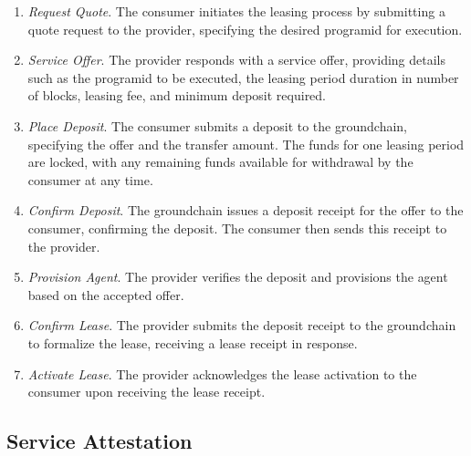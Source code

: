 \documentclass{oc}
\begin{document}
\begin{enumerate}
  \item \emph{Request Quote}. The \gls{consumer} initiates the leasing process by submitting a quote request to the \gls{provider}, specifying the desired \gls{programid} for execution.
  
  \item \emph{Service Offer}. The \gls{provider} responds with a service offer, providing details such as the \gls{programid} to be executed, the leasing period duration in number of blocks, leasing fee, and minimum deposit required.
  
  \item \emph{Place Deposit}. The \gls{consumer} submits a deposit to the \gls{groundchain}, specifying the offer and the transfer amount. The funds for one leasing period are locked, with any remaining funds available for withdrawal by the consumer at any time.
  
  \item \emph{Confirm Deposit}. The \gls{groundchain} issues a deposit receipt for the offer to the \gls{consumer}, confirming the deposit. The \gls{consumer} then sends this receipt to the \gls{provider}.
  
  \item \emph{Provision Agent}. The \gls{provider} verifies the deposit and provisions the \gls{agent} based on the accepted offer.
  
  \item \emph{Confirm Lease}. The \gls{provider} submits the deposit receipt to the \gls{groundchain} to formalize the lease, receiving a lease receipt in response.
  
  \item \emph{Activate Lease}. The \gls{provider} acknowledges the lease activation to the \gls{consumer} upon receiving the lease receipt.
\end{enumerate}

\subsection{Service Attestation}\label{sec:service-attestation}
\end{document}
